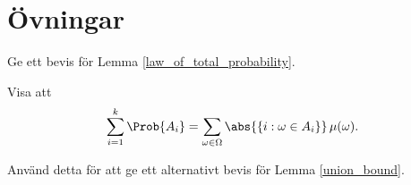 \documentclass[nobib]{tufte-handout}
\begin{document}
\section{Övningar}

\begin{xca}
    Ge ett bevis för Lemma \ref{law_of_total_probability}.
\end{xca}

\begin{xca}
    Visa att
    $$\sum_{i=1}^{k} \Prob{A_i} = \sum_{\omega \in \Omega} \abs{\left\{i: \omega \in A_i\right\}}\,\mu(\omega).$$

    Använd detta för att ge ett alternativt bevis för Lemma \ref{union_bound}.
\end{xca}

%
%
\end{document}
